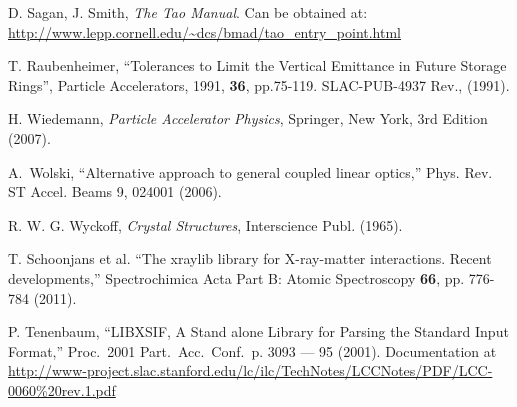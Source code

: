 \begin{thebibliography}{XXXXXXX99}
D. Sagan, J. Smith, {\it The Tao Manual}.
Can be obtained at: \hfill\break
\hspace*{0.3in}
\url{http://www.lepp.cornell.edu/~dcs/bmad/tao_entry_point.html}

T. Raubenheimer,
``Tolerances to Limit the Vertical Emittance in Future Storage Rings'', 
Particle Accelerators, 1991, {\bf 36}, pp.75-119. 
SLAC-PUB-4937 Rev., (1991).

H. Wiedemann, {\em Particle Accelerator Physics}, Springer, New York, 3rd Edition (2007). 

A.~Wolski,  ``Alternative approach to general coupled linear optics,''
Phys. Rev. ST Accel. Beams 9, 024001 (2006).

R. W. G. Wyckoff, {\em Crystal Structures}, Interscience Publ. (1965).

T. Schoonjans et al. ``The xraylib library for X-ray-matter
interactions. Recent developments,'' Spectrochimica Acta Part B: Atomic
Spectroscopy {\bf 66}, pp. 776-784 (2011).

P. Tenenbaum, ``LIBXSIF, A Stand alone Library for Parsing the Standard 
Input Format,'' Proc.\ 2001 Part.\ Acc.\ Conf.\ p. 3093 --- 95 (2001).
Documentation at
\hfill\break
\hspace*{0.3in} \url{http://www-project.slac.stanford.edu/lc/ilc/TechNotes/LCCNotes/PDF/LCC-0060%20rev.1.pdf}

\end{thebibliography}

